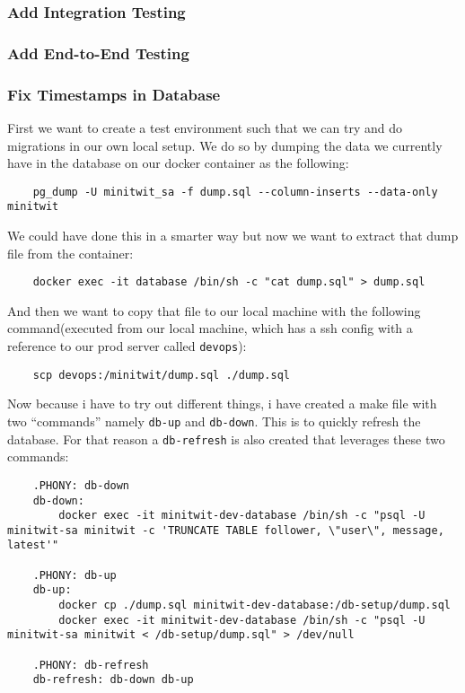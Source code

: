 \subsubsection{Add Integration Testing}
\label{log:add-integration-testing}

\subsubsection{Add End-to-End Testing}
\label{log:add-end-to-end-testing}

\subsubsection{Fix Timestamps in Database}
\label{log:fix-timestamps-in-database}

First we want to create a test environment such that we can try and do migrations in our own local setup. We do so by dumping the data we currently have in the database on our docker container as the following:
\begin{verbatim}
    pg_dump -U minitwit_sa -f dump.sql --column-inserts --data-only minitwit
\end{verbatim}

We could have done this in a smarter way but now we want to extract that dump file from the container:

\begin{verbatim}
    docker exec -it database /bin/sh -c "cat dump.sql" > dump.sql
\end{verbatim}

And then we want to copy that file to our local machine with the following command(executed from our local machine, which has a ssh config with a reference to our prod server called \texttt{devops}):

\begin{verbatim}
    scp devops:/minitwit/dump.sql ./dump.sql
\end{verbatim}

Now because i have to try out different things, i have created a make file with two ``commands'' namely \texttt{db-up} and \texttt{db-down}. This is to quickly refresh the database. For that reason a \texttt{db-refresh} is also created that leverages these two commands:

\begin{verbatim}
    .PHONY: db-down
    db-down:
        docker exec -it minitwit-dev-database /bin/sh -c "psql -U minitwit-sa minitwit -c 'TRUNCATE TABLE follower, \"user\", message, latest'"

    .PHONY: db-up
    db-up:
        docker cp ./dump.sql minitwit-dev-database:/db-setup/dump.sql
        docker exec -it minitwit-dev-database /bin/sh -c "psql -U minitwit-sa minitwit < /db-setup/dump.sql" > /dev/null

    .PHONY: db-refresh
    db-refresh: db-down db-up

\end{verbatim}

